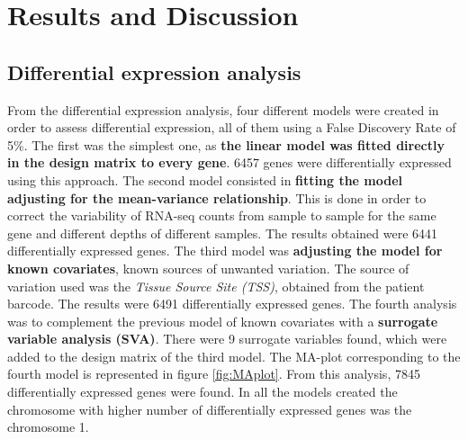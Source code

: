 \documentclass[9pt,twocolumn,twoside]{gsajnl}
\begin{document}


\section*{Results and Discussion}

\subsection{Differential expression analysis}

From the differential expression analysis, four different models were created in order to assess differential expression, all of them using a False Discovery Rate of 5\%. The first was the simplest one, as \textbf{the linear model was fitted directly in the design matrix to every gene}. 6457 genes were differentially expressed using this approach. The second model consisted in \textbf{fitting the model adjusting for the mean-variance relationship}. This is done in order to correct the variability of RNA-seq counts from sample to sample for the same gene and different depths of different samples. The results obtained were 6441 differentially expressed genes. The third model was \textbf{adjusting the model for known covariates}, known sources of unwanted variation. The source of variation used was the \textit{Tissue Source Site (TSS)}, obtained from the patient barcode. The results were 6491 differentially expressed genes. The fourth analysis was to complement the previous model of known covariates with a \textbf{surrogate variable analysis (SVA)}. There were 9 surrogate variables found, which were added to the design matrix of the third model. The MA-plot corresponding to the fourth model is represented in figure \ref{fig:MAplot}.  From this analysis, 7845 differentially expressed genes were found. In all the models created the chromosome with higher number of differentially expressed genes was the chromosome 1.
\end{document}
